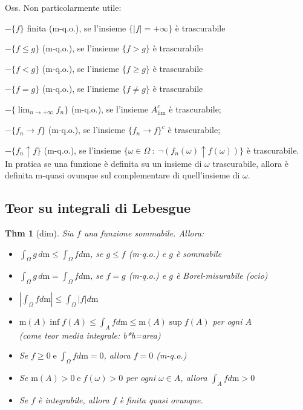 \documentclass[a4paper,11pt]{article}
\theoremstyle{plain}
\newtheorem{thm}{Thm}[section]
\theoremstyle{definition}
\theoremstyle{remark}
\begin{document}
\noindent
Oss. Non particolarmente utile:

$-\{f\}$ finita (m-q.o.), se l'insieme $\{|f|=+\infty\}$ è trascurabile

$-\{f\leq g\}$ (m-q.o.), se l'insieme $\{f>g\}$ è trascurabile

$-\{f<g\}$ (m-q.o.), se l'insieme $\{f\geq g\}$ è trascurabile

$-\{f=g\}$ (m-q.o.), se l'insieme $\{f\neq g\}$ è trascurabile

$-\{\displaystyle \lim_{n\rightarrow+\infty}f_{n}\}$ (m-q.o.), se l'insieme $A_{\lim}^{c}$ è trascurabile;

$-\{f_{n}\rightarrow f\}$ (m-q.o.), se l'insieme $\{f_{n}\rightarrow f\}^{c}$ è trascurabile;

$-\{f_{n}\uparrow f\}$ (m-q.o.), se l'insieme $\{\omega\in\Omega\ :\ \neg(f_{n}(\omega)\uparrow f(\omega))\}$ è trascurabile.\\

In pratica se una funzione è definita su un insieme di $\omega$ trascurabile, allora è definita m-quasi ovunque sul complementare di quell'insieme di $\omega$.   

\vspace{3mm}

\subsection{Teor su integrali di Lebesgue}
\begin{thm}[dim] Sia $f$ una funzione sommabile. Allora:
\begin{itemize}
\item  $\displaystyle \int_{\Omega}g \, d\mathrm{m}\leq\int_{\Omega}fd\mathrm{m}$, se $g\leq f$ (m-q.o.) e $g$ è sommabile

\item  $\displaystyle \int_{\Omega}g \, d\mathrm{m}=\int_{\Omega}fd\mathrm{m}$, se $f=g$ (m-q.o.) e $g$ è Borel-misurabile (ocio)

\item  $\displaystyle \left| \int_{\Omega}fd \mathrm{m}\right| \leq \int_{\Omega} \left| f \right| d\mathrm{m}$

\item  $\displaystyle \mathrm{m}(A)\inf f(A)\leq\int_{A}fd\mathrm{m}\leq \mathrm{m}(A)\sup f(A)$ per ogni $A$ \\ (come teor media integrale: b*h=area)

\item[$\star$]  Se $\displaystyle f\geq 0\mathrm{\;e\;}\int_{\Omega}fd\mathrm{m}=0$, allora $f=0$ (m-q.o.)

\item[$\star \star$]  Se $\mathrm{m}(A)>0\mathrm{\;e\;}f(\omega)>0$ per ogni $\omega\in A$, allora $\displaystyle \int_{A}fd\mathrm{m}>0$

\item[$\star \star \star $]  Se $f$ è integrabile, allora $f$ è finita quasi ovunque.
\end{itemize}
\end{thm}
\end{document}
